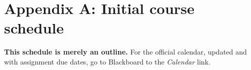 \documentclass[]{article}
\begin{document}
\vfill \eject

\section{Appendix A: Initial course schedule}

\textbf{This schedule is merely an outline.} For the official calendar, updated and with assignment due dates, go to Blackboard to the \textit{Calendar} link. 




\end{document}
